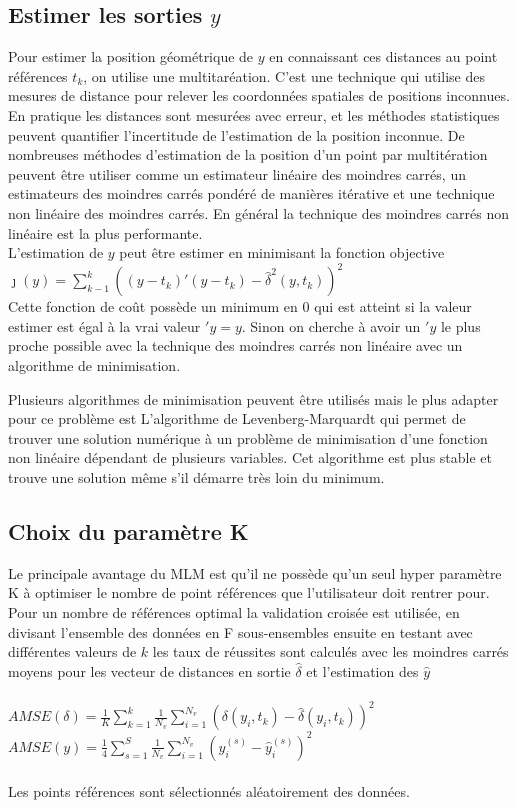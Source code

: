 \documentclass[12pt,a4paper]{report}
\begin{document}
\subsection{Estimer les sorties $y$}
\par Pour estimer la position géométrique de $y$ en connaissant ces distances au point références $t_k$, on utilise une multitaréation. C'est une technique qui utilise des mesures de distance pour relever les coordonnées spatiales de positions inconnues. En pratique les distances sont mesurées avec erreur, et les méthodes statistiques peuvent quantifier l'incertitude de l'estimation de la position inconnue. De nombreuses méthodes d'estimation de la position d'un point par multitération peuvent être utiliser comme un estimateur linéaire des moindres carrés, un estimateurs des moindres carrés pondéré de manières itérative et une technique non linéaire des moindres carrés. En général la technique des moindres carrés non linéaire est la plus performante.\\
L'estimation de $y$ peut être estimer en minimisant la fonction objective \\
$\jmath(y) = \sum_{k-1}^{k}((y-t_k)\prime(y-t_k)-\hat{\delta}^2(y,t_k))^2$ \\
Cette fonction de coût possède un minimum en 0 qui est atteint si la valeur estimer est égal à la vrai valeur $\prime{y} = y$. Sinon on cherche à avoir un $\prime{y}$ le plus proche possible avec la technique des moindres carrés non linéaire avec un algorithme de minimisation. \\
\par Plusieurs algorithmes de minimisation peuvent être utilisés mais le plus adapter pour ce problème est L'algorithme de Levenberg-Marquardt qui permet de trouver une solution numérique à un problème de minimisation d'une fonction non linéaire dépendant de plusieurs variables. Cet algorithme est plus stable et trouve une solution même s'il démarre très loin du minimum. 

\subsection{Choix du paramètre K}
\par Le principale avantage du MLM est qu'il ne possède qu'un seul hyper paramètre K à optimiser le nombre de point références que l'utilisateur doit rentrer pour. Pour un nombre de références optimal la validation croisée est utilisée, en divisant l'ensemble des données en F sous-ensembles ensuite en testant avec différentes valeurs de $k$ les taux de réussites sont calculés avec les moindres carrés moyens pour les vecteur de distances en sortie $\hat{\delta}$ et l'estimation des $\hat{y}$\\ \\
$AMSE(\delta) = \frac{1}{K} \sum_{k=1}^k \frac{1}{N_v} \sum_{i=1}^{N_v} (\delta(y_i,t_k) - \hat{\delta}(y_i,t_k))^2$ \\
$AMSE(y)=\frac{1}{4} \sum_{s = 1}^S \frac{1}{N_v} \sum_{i = 1}^{N_v} (y_i^{(s)} -\hat{y}_i^{(s)})^2$\\\\
Les points références sont sélectionnés aléatoirement des données. 
\end{document}
